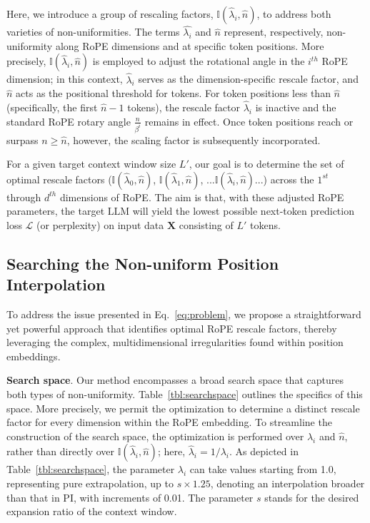 Here, we introduce a group of rescaling factors, $\mathbb{I}(\hat{\lambda}_{i},\hat{n})$, to address both varieties of non-uniformities. The terms $\hat{\lambda_i}$ and $\hat{n}$ represent, respectively, non-uniformity along RoPE dimensions and at specific token positions. More precisely, $\mathbb{I}(\hat{\lambda}_{i},\hat{n})$ is employed to adjust the rotational angle in the $i^{th}$ RoPE dimension; in this context, $\hat\lambda_{i}$ serves as the dimension-specific rescale factor, and $\hat{n}$ acts as the positional threshold for tokens. For token positions less than $\hat{n}$ (specifically, the first $\hat{n}-1$ tokens), the rescale factor $\hat\lambda_{i}$ is inactive and the standard RoPE rotary angle $\frac{n}{\beta^i}$ remains in effect. Once token positions reach or surpass $n \ge \hat{n}$, however, the scaling factor is subsequently incorporated.

For a given target context window size $L'$, our goal is to determine the set of optimal rescale factors ($\mathbb{I}(\hat{\lambda}_{0},\hat{n})$, $\mathbb{I}(\hat{\lambda}_{1},\hat{n})$, ...$\mathbb{I}(\hat{\lambda}_{i},\hat{n})$...) across the $1^{st}$ through $d^{th}$ dimensions of RoPE. The aim is that, with these adjusted RoPE parameters, the target $\text{LLM}$ will yield the lowest possible next-token prediction loss $\mathcal{L}$ (or perplexity) on input data $\mathbf{X}$ consisting of $L'$ tokens.

\subsection{Searching the Non-uniform Position Interpolation}

To address the issue presented in Eq.~\ref{eq:problem}, we propose a straightforward yet powerful approach that identifies optimal RoPE rescale factors, thereby leveraging the complex, multidimensional irregularities found within position embeddings.

\textbf{Search space}. Our method encompasses a broad search space that captures both types of non-uniformity. Table~\ref{tbl:searchspace} outlines the specifics of this space. More precisely, we permit the optimization to determine a distinct rescale factor for every dimension within the RoPE embedding. To streamline the construction of the search space, the optimization is performed over $\lambda_i$ and $\hat{n}$, rather than directly over $\mathbb{I}(\hat{\lambda}_{i},\hat{n})$; here, $\hat{\lambda}_{i}=1/\lambda_i$. As depicted in Table~\ref{tbl:searchspace}, the parameter $\lambda_i$ can take values starting from 1.0, representing pure extrapolation, up to $s\times1.25$, denoting an interpolation broader than that in PI, with increments of 0.01. The parameter $s$ stands for the desired expansion ratio of the context window.

